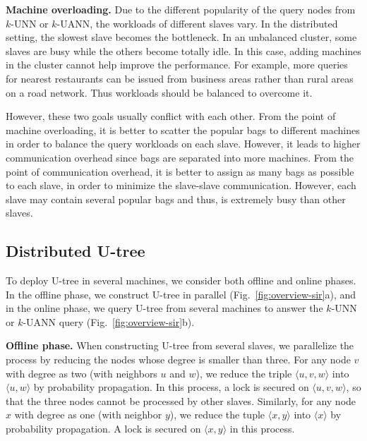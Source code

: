 {\bf Machine overloading. } Due to the different popularity of the query nodes from $k$-UNN or $k$-UANN, the workloads of different slaves vary.  
In the distributed setting, the slowest slave becomes the bottleneck. In an unbalanced cluster, some slaves are busy while the others become totally idle. In this case, adding machines in the cluster cannot help improve the performance.
For example, more queries for nearest restaurants can be issued from business areas rather than rural areas on a road network. 
Thus workloads should be balanced to overcome it. %

However, these two goals usually conflict with each other. From the point of machine overloading, 
it is better to scatter the popular bags to different machines in order to balance the query workloads on each slave. 
However, it leads to higher communication overhead 
since bags are separated into more machines.
From the point of communication overhead, it is better to assign as many bags as possible to each slave, in order to minimize the slave-slave communication. However, each slave may contain several popular bags and thus, is extremely busy than other slaves.

\subsection{Distributed U-tree } 
\label{sec:dutree}

To deploy U-tree in several machines, we consider both offline and online phases. In the offline phase, we construct U-tree in parallel (Fig.~\ref{fig:overview-sir}a), and in the online phase, we query U-tree from several machines to answer the $k$-UNN or $k$-UANN query (Fig.~\ref{fig:overview-sir}b). 

\textbf{Offline phase. } 
When constructing U-tree from several slaves, we parallelize the process by reducing the nodes whose degree is smaller than three. 
For any node $v$ with degree as two (with neighbors $u$ and $w$), we reduce the triple $\langle u,v,w\rangle$ into $\langle u,w\rangle$ by probability propagation. 
In this process, a lock is secured on $\langle u,v,w\rangle$, so that the three nodes cannot be processed by other slaves. 
Similarly, for any node $x$ with degree as one (with neighbor $y$), we reduce the tuple $\langle x,y\rangle$ into $\langle x\rangle$ by probability propagation. A lock is secured on $\langle x,y\rangle$ in this process.

